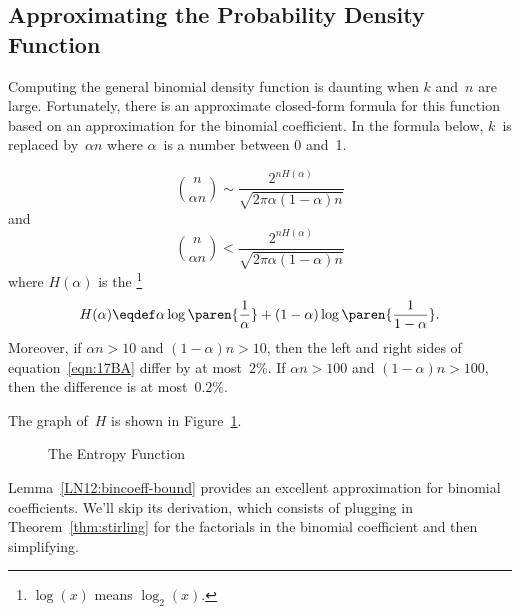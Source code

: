 \begin{editingnotes}
\subsection{Approximating the Probability Density Function}

Computing the general binomial density function is daunting when $k$
and~$n$ are large.  Fortunately, there is an approximate closed-form
formula for this function based on an approximation for the binomial
coefficient.  In the formula below, $k$~is replaced by~$\alpha n$
where $\alpha$~is a number between 0 and~1.
%
\begin{lemma}\label{LN12:bincoeff-bound}
\begin{equation}\label{eqn:17BA}
\binom{n}{\alpha n}
        \sim \frac{2^{n H(\alpha)}}{\sqrt{2 \pi \alpha (1 - \alpha) n}}
\end{equation}
and
\begin{equation}\label{eqn:17A3}
\binom{n}{\alpha n} < \frac{ 2^{n H(\alpha)} }
                           { \sqrt{2 \pi \alpha (1 - \alpha) n} }
\end{equation}
where $H(\alpha)$ is the \footnote{$\log(x)$
  means $\log_2(x)$.}
\begin{equation*}
H(\alpha) \eqdef \alpha \log\paren{\frac{1}{\alpha}} +
                (1 - \alpha) \log\paren{\frac{1}{1 - \alpha}}.
\end{equation*}
Moreover, if $\alpha n > 10$ and $(1 - \alpha) n > 10$, then the left
and right sides of equation~\eqref{eqn:17BA} differ by at most~$2\%$.  If
$\alpha n > 100$ and $(1 - \alpha) n > 100$, then the difference is at
most~$0.2\%$.
\end{lemma}

The graph of~$H$ is shown in Figure~\ref{LN12:entropy}.

\begin{figure}


\caption{The Entropy Function}
\label{LN12:entropy}

\end{figure}

Lemma~\eqref{LN12:bincoeff-bound} provides an excellent approximation
for binomial coefficients.  We'll skip its derivation, which consists
of plugging in Theorem~\ref{thm:stirling} for the factorials in the
binomial coefficient and then simplifying.


\end{editingnotes}
